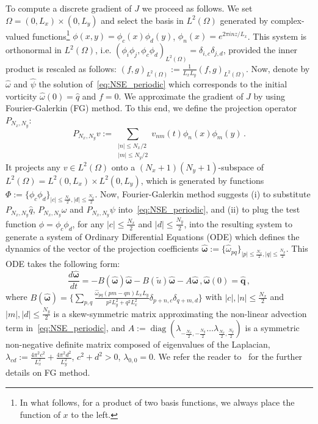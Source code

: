 \documentclass[onecolumn, 12pt, conference]{ieeeconf}
\newcommand{\Lt}{L^2(\Omega)}
\begin{document}
To compute a discrete gradient of $J$ we proceed as follows. We set  $\Omega=(0,L_x)\times(0,L_y)$ and select the basis in $\Lt$ generated by complex-valued functions\footnote{In what follows, for a product of two basis functions, we always place the function of
$x$ to the left.} $\phi(x,y) = \phi_c(x) \phi_d(y)$, $\phi_n(x)=e^{2 \pi inz/L_x}$. This system is orthonormal in $\Lt$, i.e. $(\phi_i\phi_j,\phi_c\phi_d)_{\Lt}=\delta_{i,c}\delta_{j,d}$, provided the inner product is rescaled as follows: $(f,g)_{\Lt} := \frac{1}{L_xL_y}(f,g)_{\Lt}$. Now, denote by $\hat \omega$ and $\hat \psi$ the solution of~\eqref{eq:NSE_periodic} which corresponds to the initial vorticity $\hat\omega(0)=\hat q$ and $f=0$. We approximate the gradient of $J$ by using Fourier-Galerkin (FG) method. To this end, we define the projection operator $P_{N_x,N_y}$: \[
P_{N_x,N_y} v:=\sum_{\substack{
   |n|\leq N_x/2 \\
   |m|\leq N_y/2
  }} v_{nm}(t) \phi_n(x) \phi_m(y)\,.
\]
It projects any $v\in\Lt$ onto a $(N_x+1)(N_y+1)$-subspace of $L^2(\Omega)=L^2(0,L_x)\times L^2(0,L_y)$, which is generated by functions $\Phi:=\{\phi_c\phi_d\}_{|c|\le\frac{N_x}2,|d|\le\frac{N_y}2}$. Now, Fourier-Galerkin method suggests (i) to substitute $P_{N_x,N_y} \hat q$, $P_{N_x,N_y} \omega $ and $P_{N_x,N_y}\psi$ into~\eqref{eq:NSE_periodic}, and (ii) to plug the test function $\phi = \phi_c\phi_d$, for any $|c|\le\frac{N_x}2$ and $|d|\le\frac{N_y}2$, into the resulting system to generate a system of Ordinary Differential Equations (ODE) which defines the dynamics of the vector of the projection coefficients $\hat{\bm\omega}:=\{\hat\omega_{pq}\}_{|p|\le\frac{N_x}2,|q|\le\frac{N_y}2}$. This ODE takes the following form:
\begin{equation}
  \label{eq:FG_model}
  \dfrac{d\hat{\bm \omega}}{dt} = -B(\hat{\bm \omega})\hat{\bm\omega} - B(\tilde u) \hat{\bm\omega} - A\hat{\bm \omega}\,, \hat{\bm\omega}(0)=\hat{\bm q}\,,
\end{equation}
where $
B(\hat{\bm{\omega}}) = \{\sum_{p,q}\frac{\hat{\omega}_{pq}(pm-qn)L_xL_y}{p^2 L_y^2+q^2 L_x^2}\delta_{p+n,c} \delta_{q+m,d}\}$ with $|c|,|n|\le \frac{N_x}2$ and $|m|,|d|\le \frac{N_y}2$ is a skew-symmetric matrix approximating the non-linear advection term in~\eqref{eq:NSE_periodic}, and $
A:=\operatorname{diag}(\lambda_{-\frac{N_x}2,-\frac{N_y}2}\dots \lambda_{\frac{N_x}2,\frac{N_y}2})$ is a symmetric non-negative definite matrix composed of eigenvalues of the Laplacian, $\lambda_{cd}:=\frac{4\pi^2 c^2}{L_x^2} + \frac{4\pi^2 d^2}{L_y^2}$, $c^2+d^2>0$, $\lambda_{0,0}=0$. We refer the reader to~\cite{MajdaBertozzi2002} for the further details on FG method. %
\end{document}
